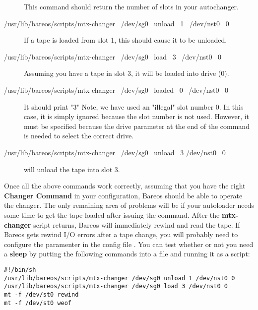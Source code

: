 \begin{description}
This command should return the number of slots in your autochanger.

\item [/usr/lib/bareos/scripts/mtx-changer \ /dev/sg0 \ unload \ 1 \ /dev/nst0 \ 0 ]

   If a tape is loaded from slot 1, this should cause it to be unloaded.

\item [/usr/lib/bareos/scripts/mtx-changer \ /dev/sg0 \ load \ 3 \ /dev/nst0 \ 0 ]

Assuming you have a tape in slot 3,  it will be loaded into drive (0).


\item [/usr/lib/bareos/scripts/mtx-changer \ /dev/sg0 \ loaded \ 0 \ /dev/nst0 \ 0]

It should print "3"
Note, we have used an "illegal" slot number 0. In this case, it is simply
ignored because the slot number is not used.  However, it must be specified
because the drive parameter at the end of the command is needed to select
the correct drive.

\item [/usr/lib/bareos/scripts/mtx-changer \ /dev/sg0 \ unload \ 3 /dev/nst0 \ 0]

will unload the tape into slot 3.

\end{description}

Once all the above commands work correctly, assuming that you have the right
{\bf Changer Command} in your configuration, Bareos should be able to operate
the changer. The only remaining area of problems will be if your autoloader
needs some time to get the tape loaded after issuing the command. After the
{\bf mtx-changer} script returns, Bareos will immediately rewind and read the
tape. If Bareos gets rewind I/O errors after a tape change, you will probably
need to configure the  paramenter in the config file .
You can test whether or not you need a {\bf sleep} by putting the following
commands into a file and running it as a script:

\footnotesize
\begin{verbatim}
#!/bin/sh
/usr/lib/bareos/scripts/mtx-changer /dev/sg0 unload 1 /dev/nst0 0
/usr/lib/bareos/scripts/mtx-changer /dev/sg0 load 3 /dev/nst0 0
mt -f /dev/st0 rewind
mt -f /dev/st0 weof
\end{verbatim}
\normalsize

